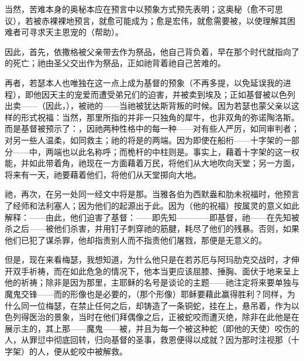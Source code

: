 当然，苦难本身的奥秘本应在预言中以预象方式预先表明；这奥秘（愈不可思议），若被赤裸裸地预言，就愈可能成为；愈是宏伟，就愈需要被，以使理解其困难者可寻求天主恩宠的（帮助）。\par

因此，首先，依撒格被父亲带去作为祭品，他自己背负着，早在那个时代就指向了的死亡；祂由圣父交出作为祭品，正如祂背着祂自己苦难的。\par

再者，若瑟本人也唯独在这一点上成为基督的预象（不再多提，以免延误我的进程），即他因天主的宠爱而遭受弟兄们的迫害，并被卖到埃及；正如基督被以色列出卖——（因此，），被祂的——当祂被犹达斯背叛的时候。因为若瑟也蒙父亲以这样的形式祝福：当然，那里所指的并非一只独角的犀牛，也非双角的弥诺陶洛斯。而是基督被预示了：，因祂两种性格中的每一种——对有些人严厉，如同审判者；对另一些人温柔，如同救主；祂的将是的两端。因为即使在船桁——十字架的一部分——中，两端也以此名称呼；而桅杆的中柱则是。事实上，藉着十字架的这一权能，并如此带着角，祂现在一方面藉着万民，将他们从大地吹向天堂；另一方面，将来有一天，祂要藉着他们，将他们从天堂掷向大地。\par

祂，再次，在另一处同一经文中将是那。当雅各伯为西默盎和肋未祝福时，他预言了经师和法利塞人；因为他们的起源出于此。因为（他的祝福）按属灵的意义如此解释：——由此，他们迫害了基督：——即先知————即基督，祂——在先知被杀之后——被他们杀害，并用钉子刺穿祂的筋腱，耗尽了他们的残暴。否则，如果他们已犯了谋杀罪，他却指责别人而不指责他们屠戮，那便是无意义的。\par

但是，现在来看梅瑟，我想知道，为什么他只是在若苏厄与阿玛肋克交战时，才伸开双手祈祷，而在如此危急的情况下，他本当更应该屈膝、捶胸、面伏于地来呈上他的祈祷；除非是因为那里，主耶稣的名号是谈论的主题——祂注定将来要单独与魔鬼交锋——而的形像也是必要的，（那个形像）耶稣要藉此赢得胜利？同样，为什么同一位梅瑟，在禁止任何之后，却铸造了一条铜蛇，挂在上，悬吊着，作为以色列得医治的景象，当时在他们拜偶像之后，正被蛇咬而遭灭绝，除非在此他是在展示主的，其上那——魔鬼——被，并且为每一个被这种蛇（即他的天使）咬伤的人，从罪愆中彻底回转，归向基督的圣事，救恩便得以成就？因为那时注视那（十字架）的人，便从蛇咬中被解救。\par

